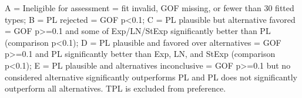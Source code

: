 \begin{flushleft}\footnotesize A = Ineligible for assessment = fit invalid, GOF missing, or fewer than 30 fitted types; B = PL rejected = GOF p<0.1; C = PL plausible but alternative favored = GOF p>=0.1 and some of Exp/LN/StExp significantly better than PL (comparison p<0.1); D = PL plausible and favored over alternatives = GOF p>=0.1 and PL significantly better than Exp, LN, and StExp (comparison p<0.1); E = PL plausible and alternatives inconclusive = GOF p>=0.1 but no considered alternative significantly outperforms PL and PL does not significantly outperform all alternatives. TPL is excluded from preference.\end{flushleft}
